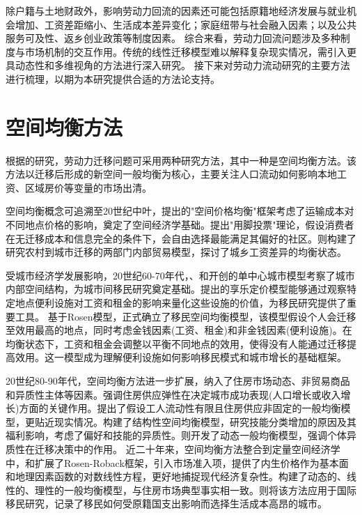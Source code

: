 \documentclass[
  a4paper,
  zihao=-4,
  fontset=mac,
  AutoFakeBold,
  AutoFakeSlant,
  oneside]{ctexbook}
\begin{document}
除户籍与土地财政外，影响劳动力回流的因素还可能包括原籍地经济发展与就业机会增加、工资差距缩小、生活成本差异变化；家庭纽带与社会融入因素；以及公共服务可及性、返乡创业政策等制度因素。
综合来看，劳动力回流问题涉及多种制度与市场机制的交互作用。传统的线性迁移模型难以解释复杂现实情况，需引入更具动态性和多维视角的方法进行深入研究。
接下来对劳动力流动研究的主要方法进行梳理，以期为本研究提供合适的方法论支持。


\section{空间均衡方法}

根据\textcite{jiaEconomicsInternalMigration2023}的研究，劳动力迁移问题可采用两种研究方法，其中一种是空间均衡方法。该方法以迁移后形成的新空间一般均衡为核心，主要关注人口流动如何影响本地工资、区域房价等变量的市场出清。

空间均衡概念可追溯至20世纪中叶，\textcite{samuelsonSpatialPriceEquilibrium1952}提出的"空间价格均衡"框架考虑了运输成本对不同地点价格的影响，奠定了空间经济学基础。\textcite{tieboutPureTheoryLocal1956}提出"用脚投票"理论，假设消费者在无迁移成本和信息完全的条件下，会自由选择最能满足其偏好的社区。\textcite{harrisMigrationUnemploymentDevelopment1970}则构建了研究农村到城市迁移的两部门内部贸易模型，探讨了城乡工资差异的均衡状态。

受城市经济学发展影响，20世纪60-70年代，\textcite{alonsoLocationLandUse1964}、\textcite{muthCitiesHousingSpatial1969}和\textcite{millsAggregativeModelResource1967}开创的单中心城市模型考察了城市内部空间结构，为城市间移民研究奠定基础。\textcite{rosenHedonicPricesImplicit1974}提出的享乐定价模型能够通过观察特定地点便利设施对工资和租金的影响来量化这些设施的价值，为移民研究提供了重要工具。
基于Rosen模型，\textcite{robackWagesRentsQuality1982}正式确立了移民空间均衡模型，该模型假设个人会迁移至效用最高的地点，同时考虑金钱因素(工资、租金)和非金钱因素(便利设施)。在均衡状态下，工资和租金会调整以平衡不同地点的效用，使得没有人能通过迁移提高效用。这一模型成为理解便利设施如何影响移民模式和城市增长的基础框架。

20世纪80-90年代，空间均衡方法进一步扩展，纳入了住房市场动态、非贸易商品和异质性主体等因素。\textcite{glaeserWealthCitiesAgglomeration2009}强调住房供应弹性在决定城市成功表现(人口增长或收入增长)方面的关键作用。\textcite{morettiLocalLaborMarkets2011}提出了假设工人流动性有限且住房供应非固定的一般均衡模型，更贴近现实情况。\textcite{diamondDeterminantsWelfareImplications2016}构建了结构性空间均衡模型，研究技能分类增加的原因及其福利影响，考虑了偏好和技能的异质性。\textcite{coen-piraniEffectHouseholdAppliances2010}则开发了动态一般均衡模型，强调个体异质性在迁移决策中的作用。
近二十年来，空间均衡方法整合到定量空间经济学中，\textcite{ahlfeldtEconomicsDensityEvidence2015}和\textcite{reddingQuantitativeSpatialEconomics2017}扩展了Rosen-Roback框架，引入市场准入项，提供了内生价格作为基本面和地理因素函数的对数线性方程，更好地捕捉现代经济复杂性。\textcite{glaeserHousingDynamicsUrban2014}构建了动态的、线性的、理性的一般均衡模型，与住房市场典型事实相一致。\textcite{albertImmigrationSpatialEquilibrium2022}则将该方法应用于国际移民研究，记录了移民如何受原籍国支出影响而选择生活成本高昂的城市。
\end{document}
